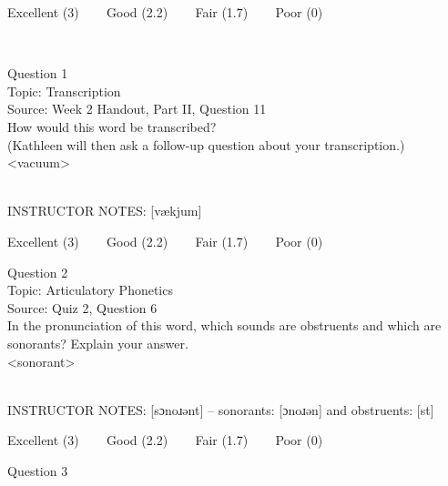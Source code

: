 \documentclass[12pt]{article}
\begin{document}
\vfill
Excellent (3) ~~~ Good (2.2) ~~~ Fair (1.7) ~~~ Poor (0)
\newpage

\begin{center}
\textbf{{\color{red}{\HUGE END OF EXAM}}}\\

\end{center}
\newpage

\begin{center}
\textbf{{\color{blue}{\HUGE START OF EXAM\\}}}

\textbf{{\color{blue}{\HUGE Student ID: 51697\\}}}

\textbf{{\color{blue}{\HUGE \\}}}

\end{center}
\newpage

{\large Question 1}\\

Topic: Transcription\\
Source: Week 2 Handout, Part II, Question 11\\

How would this word be transcribed?\\ (Kathleen will then ask a follow-up question about your transcription.)\\

<vacuum>


~\\
INSTRUCTOR NOTES: [vækjum]


\vfill
Excellent (3) ~~~ Good (2.2) ~~~ Fair (1.7) ~~~ Poor (0)
\newpage

{\large Question 2}\\

Topic: Articulatory Phonetics\\
Source: Quiz 2, Question 6\\

In the pronunciation of this word, which sounds are obstruents and which are sonorants? Explain your answer.\\

<sonorant>


~\\
INSTRUCTOR NOTES: [sɔnoɹənt] -- sonorants: [ɔnoɹən] and obstruents: [st]


\vfill
Excellent (3) ~~~ Good (2.2) ~~~ Fair (1.7) ~~~ Poor (0)
\newpage

{\large Question 3}\\
\end{document}
